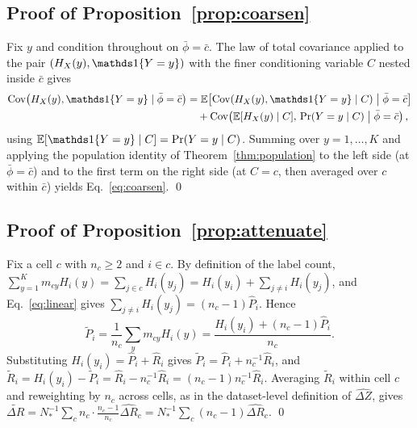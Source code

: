 \subsection{Proof of Proposition~\ref{prop:coarsen}}
Fix $y$ and condition throughout on $\bar\phi=\bar c$. The law of total covariance
applied to the pair $(H_X(y),\ind \{Y=y\})$ with the finer conditioning variable $C$
nested inside $\bar c$ gives
\begin{align*}
\operatorname{Cov}\!\left(H_X(y),\ind \{Y=y\}\mid\bar\phi=\bar c\right)
&=\mathbb E\!\left[\operatorname{Cov}(H_X(y),\ind \{Y=y\}\mid C)
   \;\middle|\;\bar\phi=\bar c\right]\\
&\quad+\operatorname{Cov}\!\left(\mathbb E[H_X(y)\mid C],\,
   \Pr(Y=y\mid C)\;\middle|\;\bar\phi=\bar c\right),
\end{align*}
using $\mathbb E[\ind \{Y=y\}\mid C]=\Pr(Y=y\mid C)$. Summing over $y=1,\ldots,K$ and
applying the population identity of Theorem~\ref{thm:population} to the left side (at
$\bar\phi=\bar c$) and to the first term on the right side (at $C=c$, then averaged over
$c$ within $\bar c$) yields Eq.~\eqref{eq:coarsen}. \qed

\subsection{Proof of Proposition~\ref{prop:attenuate}}
Fix a cell $c$ with $n_c\ge2$ and $i\in c$. By definition of the label count,
$\sum_{y=1}^K m_{cy}H_i(y)=\sum_{j\in c}H_i(y_j)=H_i(y_i)+\sum_{j\ne i}H_i(y_j)$, and
Eq.~\eqref{eq:linear} gives $\sum_{j\ne i}H_i(y_j)=(n_c-1)\hat P_i$. Hence
\[
\tilde P_i=\frac1{n_c}\sum_{y}m_{cy}H_i(y)
=\frac{H_i(y_i)+(n_c-1)\hat P_i}{n_c}.
\]
Substituting $H_i(y_i)=\hat P_i+\hat R_i$ gives
$\tilde P_i=\hat P_i+n_c^{-1}\hat R_i$, and $\tilde R_i=H_i(y_i)-\tilde P_i
=\hat R_i-n_c^{-1}\hat R_i=(n_c-1)n_c^{-1}\hat R_i$. Averaging $\tilde R_i$ within cell
$c$ and reweighting by $n_c$ across cells, as in the dataset-level definition of
$\widehat{\Delta Z}$, gives
$\widetilde{\Delta R}=N_*^{-1}\sum_{c}n_c\cdot\frac{n_c-1}{n_c}\widehat{\Delta R}_c
=N_*^{-1}\sum_c(n_c-1)\widehat{\Delta R}_c$. \qed

